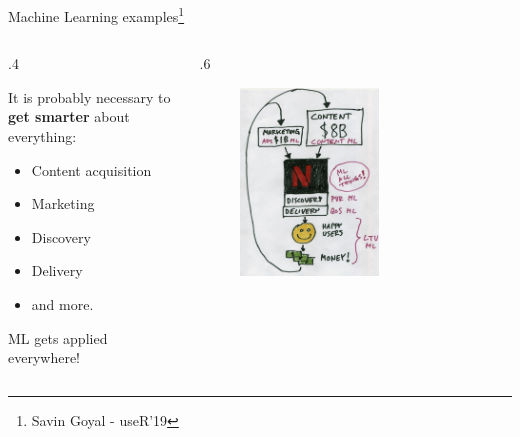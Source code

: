 \documentclass[
  9pt,
  ignorenonframetext,
  aspectratio=169,
  t, dvipsnames]{beamer}
\providecommand{\tightlist}{%
  \setlength{\itemsep}{0pt}\setlength{\parskip}{0pt}}\usepackage{longtable,booktabs,array}
\theoremstyle{definition}
\def\begincols{\begin{columns}}
\def\begincol{\begin{column}}
\def\endcol{\end{column}}
\def\endcols{\end{columns}}
\begin{document}
\begin{frame}{Machine Learning examples\footnote{Savin Goyal - useR'19}}
\protect\hypertarget{machine-learning-examples-2}{}
\begincols
\begincol{.4\textwidth}

It is probably necessary to \textbf{get smarter} about everything:

\begin{itemize}
\tightlist
\item
  Content acquisition
\item
  Marketing
\item
  Discovery
\item
  Delivery
\item
  and more.
\end{itemize}

ML gets applied everywhere! \endcol

\begincol{.6\textwidth}

\begin{figure}

{\centering \includegraphics[width=0.6\textwidth,height=\textheight]{img/netflix2.png}

}

\end{figure}

\endcol
\endcols
\end{frame}
\end{document}
